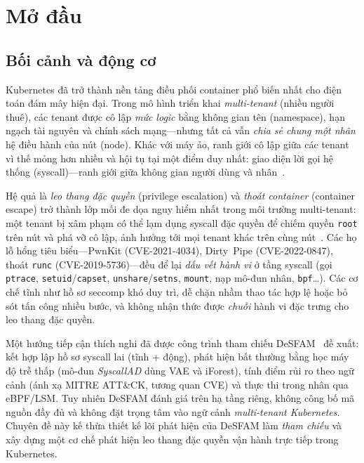 \section{Mở đầu}
\label{sec:intro}

\subsection{Bối cảnh và động cơ}
Kubernetes đã trở thành nền tảng điều phối container phổ biến nhất cho điện toán
đám mây hiện đại. Trong mô hình triển khai \emph{multi-tenant} (nhiều người thuê),
các tenant được cô lập \emph{mức logic} bằng không gian tên (namespace), hạn ngạch
tài nguyên và chính sách mạng---nhưng tất cả vẫn \emph{chia sẻ chung một nhân} hệ
điều hành của nút (node). Khác với máy ảo, ranh giới cô lập giữa các tenant vì thế
mỏng hơn nhiều và hội tụ tại một điểm duy nhất: giao diện lời gọi hệ thống
(syscall)---ranh giới giữa không gian người dùng và nhân~\cite{ref1_jarkas_survey,
ref3_sultan_survey}.

Hệ quả là \emph{leo thang đặc quyền} (privilege escalation) và \emph{thoát
container} (container escape) trở thành lớp mối đe dọa nguy hiểm nhất trong môi
trường multi-tenant: một tenant bị xâm phạm có thể lạm dụng syscall đặc quyền để
chiếm quyền \texttt{root} trên nút và phá vỡ cô lập, ảnh hưởng tới mọi tenant khác
trên cùng nút~\cite{ref5_combe_docker}. Các họ lỗ hổng tiêu biểu---PwnKit
(\mbox{CVE-2021-4034}), Dirty~Pipe (\mbox{CVE-2022-0847}), thoát \texttt{runc}
(\mbox{CVE-2019-5736})---đều để lại \emph{dấu vết hành vi} ở tầng syscall (gọi
\texttt{ptrace}, \texttt{setuid}/\texttt{capset}, \texttt{unshare}/\texttt{setns},
\texttt{mount}, nạp mô-đun nhân, \texttt{bpf}\dots). Các cơ chế tĩnh như hồ sơ
seccomp khó duy trì, dễ chặn nhầm thao tác hợp lệ hoặc bỏ sót tấn công nhiều bước,
và không nhận thức được \emph{chuỗi} hành vi đặc trưng cho leo thang đặc quyền.

Một hướng tiếp cận thích nghi đã được công trình tham chiếu
DeSFAM~\cite{desfam_original} đề xuất: kết hợp lập hồ sơ syscall lai (tĩnh + động),
phát hiện bất thường bằng học máy độ trễ thấp (mô-đun \emph{SyscallAD} dùng VAE và
iForest), tính điểm rủi ro theo ngữ cảnh (ánh xạ MITRE ATT\&CK, tương quan CVE) và
thực thi trong nhân qua eBPF/LSM. Tuy nhiên DeSFAM đánh giá trên hạ tầng riêng,
không công bố mã nguồn đầy đủ và không đặt trọng tâm vào ngữ cảnh \emph{multi-tenant
Kubernetes}. Chuyên đề này kế thừa thiết kế lõi phát hiện của DeSFAM làm
\emph{tham chiếu} và xây dựng một cơ chế phát hiện leo thang đặc quyền vận hành
trực tiếp trong Kubernetes.

